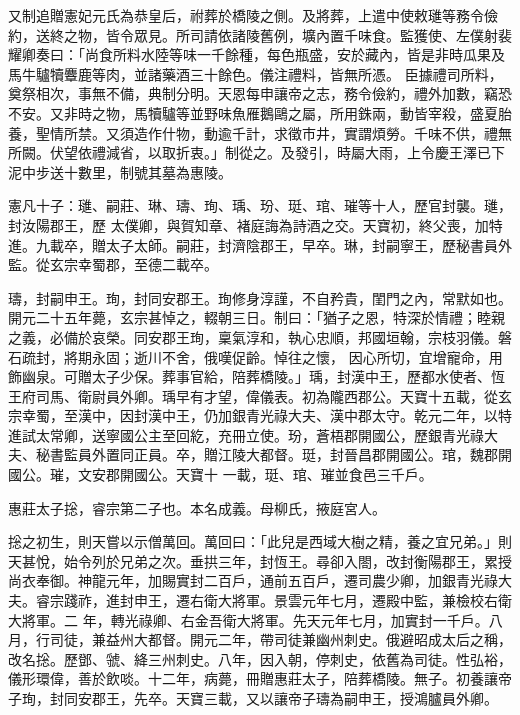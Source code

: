 \begin{pinyinscope}
 又制追贈憲妃元氏為恭皇后，祔葬於橋陵之側。及將葬，上遣中使敕璡等務令儉約，送終之物，皆令眾見。所司請依諸陵舊例，壙內置千味食。監獲使、左僕射裴耀卿奏曰：「尚食所料水陸等味一千餘種，每色瓶盛，安於藏內，皆是非時瓜果及馬牛驢犢麞鹿等肉，並諸藥酒三十餘色。儀注禮料，皆無所憑。
 臣據禮司所料，奠祭相次，事無不備，典制分明。天恩每申讓帝之志，務令儉約，禮外加數，竊恐不安。又非時之物，馬犢驢等並野味魚雁鵝鷗之屬，所用銖兩，動皆宰殺，盛夏胎養，聖情所禁。又須造作什物，動逾千計，求徵市井，實謂煩勞。千味不供，禮無所闕。伏望依禮減省，以取折衷。」制從之。及發引，時屬大雨，上令慶王澤已下泥中步送十數里，制號其墓為惠陵。



 憲凡十子：璡、嗣莊、琳、璹、珣、瑀、玢、珽、琯、璀等十人，歷官封襲。璡，封汝陽郡王，歷
 太僕卿，與賀知章、褚庭誨為詩酒之交。天寶初，終父喪，加特進。九載卒，贈太子太師。嗣莊，封濟陰郡王，早卒。琳，封嗣寧王，歷秘書員外監。從玄宗幸蜀郡，至德二載卒。



 璹，封嗣申王。珣，封同安郡王。珣修身淳謹，不自矜貴，閨門之內，常默如也。開元二十五年薨，玄宗甚悼之，輟朝三日。制曰：「猶子之恩，特深於情禮；睦親之義，必備於哀榮。同安郡王珣，稟氣淳和，執心忠順，邦國垣翰，宗枝羽儀。磐石疏封，將期永固；逝川不舍，俄嘆促齡。悼往之懷，
 因心所切，宜增寵命，用飾幽泉。可贈太子少保。葬事官給，陪葬橋陵。」瑀，封漢中王，歷都水使者、恆王府司馬、衛尉員外卿。瑀早有才望，偉儀表。初為隴西郡公。天寶十五載，從玄宗幸蜀，至漢中，因封漢中王，仍加銀青光祿大夫、漢中郡太守。乾元二年，以特進試太常卿，送寧國公主至回紇，充冊立使。玢，蒼梧郡開國公，歷銀青光祿大夫、秘書監員外置同正員。卒，贈江陵大都督。珽，封晉昌郡開國公。琯，魏郡開國公。璀，文安郡開國公。天寶十
 一載，珽、琯、璀並食邑三千戶。



 惠莊太子捴，睿宗第二子也。本名成義。母柳氏，掖庭宮人。



 捴之初生，則天嘗以示僧萬回。萬回曰：「此兒是西域大樹之精，養之宜兄弟。」則天甚悅，始令列於兄弟之次。垂拱三年，封恆王。尋卻入閤，改封衡陽郡王，累授尚衣奉御。神龍元年，加賜實封二百戶，通前五百戶，遷司農少卿，加銀青光祿大夫。睿宗踐祚，進封申王，遷右衛大將軍。景雲元年七月，遷殿中監，兼檢校右衛大將軍。二
 年，轉光祿卿、右金吾衛大將軍。先天元年七月，加實封一千戶。八月，行司徒，兼益州大都督。開元二年，帶司徒兼幽州刺史。俄避昭成太后之稱，改名捴。歷鄧、虢、絳三州刺史。八年，因入朝，停刺史，依舊為司徒。性弘裕，儀形環偉，善於飲啖。十二年，病薨，冊贈惠莊太子，陪葬橋陵。無子。初養讓帝子珣，封同安郡王，先卒。天寶三載，又以讓帝子璹為嗣申王，授鴻臚員外卿。




\end{pinyinscope}
